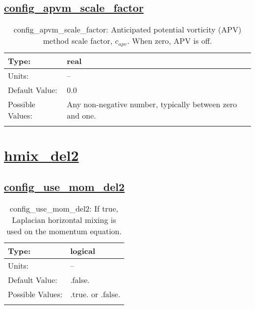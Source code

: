 \subsection[config\_apvm\_scale\_factor]{\hyperref[sec:nm_tab_hmix]{config\_apvm\_scale\_factor}}
\label{subsec:nm_sec_config_apvm_scale_factor}
\begin{center}
\begin{longtable}{| p{2.0in} || p{4.0in} |}
    \hline
    Type: & real \\
    \hline
    Units: & -- \\
    \hline
    Default Value: & 0.0 \\
    \hline
    Possible Values: & Any non-negative number, typically between zero and one. \\
    \hline
    \caption{config\_apvm\_scale\_factor: Anticipated potential vorticity (APV) method scale factor, $c_{apv}$. When zero, APV is off.}
\end{longtable}
\end{center}
\section[hmix\_del2]{\hyperref[sec:nm_tab_hmix_del2]{hmix\_del2}}
\label{sec:nm_sec_hmix_del2}
\subsection[config\_use\_mom\_del2]{\hyperref[sec:nm_tab_hmix_del2]{config\_use\_mom\_del2}}
\label{subsec:nm_sec_config_use_mom_del2}
\begin{center}
\begin{longtable}{| p{2.0in} || p{4.0in} |}
    \hline
    Type: & logical \\
    \hline
    Units: & -- \\
    \hline
    Default Value: & .false. \\
    \hline
    Possible Values: & .true. or .false. \\
    \hline
    \caption{config\_use\_mom\_del2: If true, Laplacian horizontal mixing is used on the momentum equation.}
\end{longtable}
\end{center}
